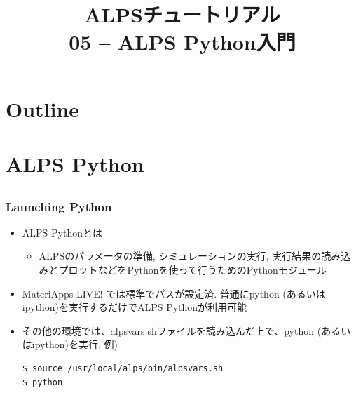 
\title{ALPSチュートリアル \\ 05 -- ALPS Python入門}




\begin{frame}
 \titlepage
\end{frame}

\section*{Outline}
\begin{frame}
 \tableofcontents
\end{frame}

\section{ALPS Python}

\subsection*{\redm\whiteb\greenb}
\begin{frame}[t,fragile]
 \frametitle{Launching Python}
 \begin{itemize}
 \item ALPS Pythonとは
   \begin{itemize}
   \item ALPSのパラメータの準備, シミュレーションの実行, 実行結果の読み込みとプロットなどをPythonを使って行うためのPythonモジュール
   \end{itemize}
 \item MateriApps LIVE! では標準でパスが設定済. 普通にpython (あるいはipython)を実行するだけでALPS Pythonが利用可能

 \item その他の環境では、alpsvars.shファイルを読み込んだ上で、python (あるいはipython)を実行. 例)
\begin{lstlisting}
$ source /usr/local/alps/bin/alpsvars.sh
$ python
\end{lstlisting}
\end{itemize}
\end{frame}

